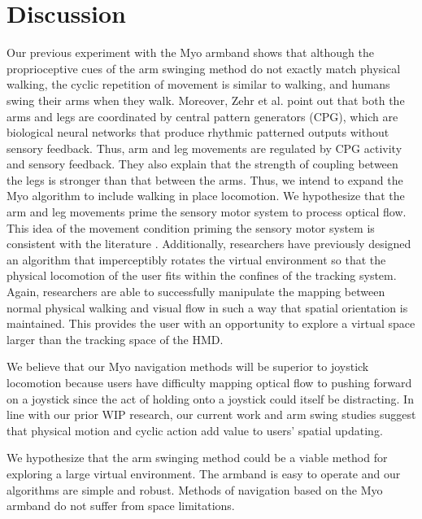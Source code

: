 \documentclass{vgtc}                          %
\begin{document}
\section{Discussion}
Our previous experiment \cite{previousMYO} with the Myo armband shows that although the
proprioceptive cues of the arm swinging method do not exactly match physical walking,
the cyclic repetition of movement is similar to walking,
and humans swing their arms when they walk.
Moreover, Zehr et al. \cite{zehr} point out that both the arms and legs are coordinated by central pattern generators (CPG),
which are biological neural networks that produce rhythmic patterned outputs without sensory feedback.
Thus, arm and leg movements are regulated
by CPG activity and sensory feedback.
They also explain that the
strength of coupling between the legs is stronger than that between the arms.
Thus, we intend to expand the Myo algorithm to include walking in place locomotion. 
We hypothesize that the arm and leg movements prime the sensory motor system to process optical flow.
This idea of the movement condition priming the sensory motor system is consistent with
the literature \cite{Engel:2008VRST,Nitzsche2004:Presence,Razzaque2001:Eurographics,Steinicke:2010,Williams2006:APGV}.
Additionally, researchers \cite{Engel:2008VRST,Nitzsche2004:Presence,Razzaque2001:Eurographics,Steinicke:2010}
have previously designed an algorithm
that imperceptibly rotates the virtual environment so that the physical locomotion of the user fits within the
confines of the tracking system.
Again, researchers are able to successfully manipulate the mapping between normal physical walking
and visual flow in such a way that spatial orientation is maintained.
This provides the user with an opportunity to explore a virtual space
larger than the tracking space of the HMD.


We believe that our Myo navigation methods will be superior to joystick locomotion because
users have difficulty mapping optical flow to pushing forward on a joystick since the act of holding onto a joystick could
itself be distracting.
In line with our prior WIP research, our current work and arm swing studies suggest that physical motion and cyclic action add
value to users' spatial updating.

We hypothesize that the arm swinging method could be a viable method
for exploring a large virtual environment.
The armband is easy to operate and our algorithms are simple and robust.
Methods of navigation based on the Myo armband do not suffer from space limitations.
\end{document}
